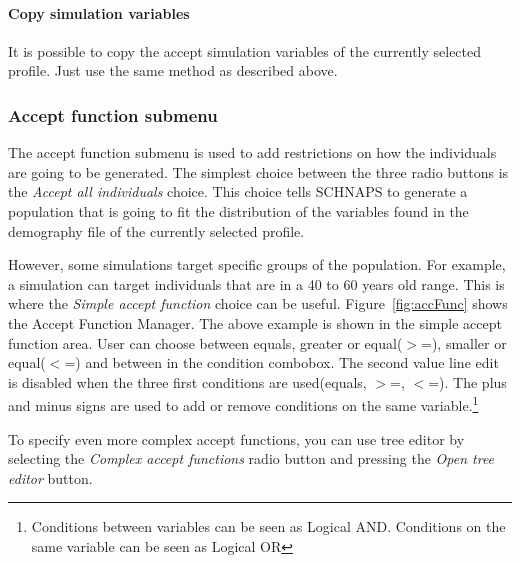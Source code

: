 \documentclass[a4paper,11pt]{report}
\begin{document}
\paragraph{Copy simulation variables}
It is possible to copy the accept simulation variables of the currently selected profile. Just use the same method as described above.

\subsubsection{Accept function submenu}
\label{subsubsec:AccFunc}
The accept function submenu is used to add restrictions on how the individuals are going to be generated. The simplest choice between the three radio buttons is the \emph{Accept all individuals} choice. This choice tells SCHNAPS to generate a population that is going to fit the distribution of the variables found in the demography file of the currently selected profile.

However, some simulations target specific groups of the population. For example, a simulation can target individuals that are in a 40 to 60 years old range. This is where the \emph{Simple accept function} choice can be useful. Figure~\ref{fig:accFunc} shows the Accept Function Manager. The above example is shown in the simple accept function area. User can choose between equals, greater or equal($>$=), smaller or equal($<$=) and between in the condition combobox. The second value line edit is disabled when the three first conditions are used(equals, $>$=, $<$=). The plus and minus signs are used to add or remove conditions on the same variable.\footnote{Conditions between variables can be seen as Logical AND. Conditions on the same variable can be seen as Logical OR}

To specify even more complex accept functions, you can use tree editor by selecting the \emph{Complex accept functions} radio button and pressing the \emph{Open tree editor} button.
\end{document}

